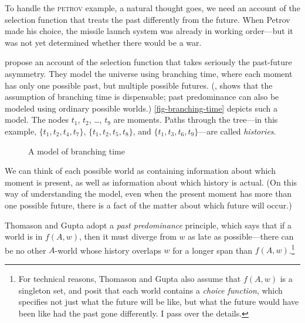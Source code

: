 To handle the \textsc{petrov} example, a natural thought goes, we need an account of the selection function that treats the past differently from the future. When Petrov made his choice, the missile launch system was already in working order---but it was not yet determined whether there would be a war.

\citet{Thomason1980-THOATO-4} propose an account of the selection function that takes seriously the past-future asymmetry.  They model the universe using branching time, where each moment has only one possible past, but multiple possible futures.  (\citealp{Cross1990-CROTNA}, shows that the assumption of branching time is dispensable; past predominance can also be modeled using ordinary possible worlds.)  \autoref{fig-branching-time} depicts such a model. The nodes $t_1$, $t_2$, \ldots, $t_9$ are moments.  Paths through the tree---in this example, $\{t_1, t_2, t_4, t_7\}$, $\{t_1, t_2, t_5, t_8\}$, and $\{t_1, t_3, t_6, t_9\}$---are called \emph{histories}.

\begin{figure}
\centering
{}
\caption{A model of branching time}
\label{fig-branching-time}
\end{figure}

We can think of each possible world as containing information about which moment is present, as well as information about which history is actual.  (On this way of understanding the model, even when the present moment has more than one possible future, there is a fact of the matter about which future will occur.)

Thomason and Gupta adopt a \emph{past predominance} principle, which says that if a world is in $f(A, w)$, then it must diverge from $w$ as late as possible---there can be no other $A$-world whose history overlaps $w$ for a longer span than $f(A, w)$.\footnote{For technical reasons, Thomason and Gupta also assume that $f(A, w)$ is a singleton set, and posit that each world contains a \emph{choice function}, which specifies not just what the future will be like, but what the future would have been like had the past gone differently.  I pass over the details.}

